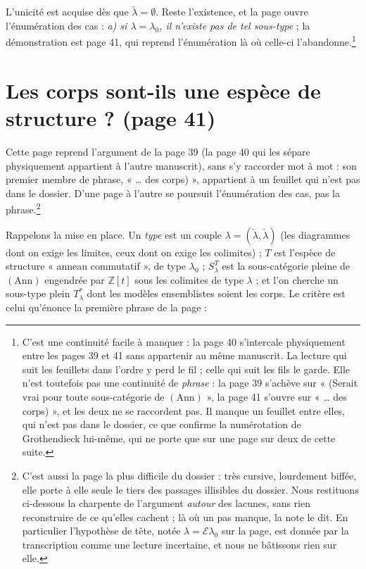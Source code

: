 \documentclass[11pt,a4paper]{article}
\begin{document}
L'unicité est acquise dès que $\underrightarrow{\lambda} = \emptyset$. Reste
l'existence, et la page ouvre l'énumération des cas : \emph{a) si
$\lambda = \lambda_{0}$, il n'existe pas de tel sous-type} ; la démonstration
est page 41, qui reprend l'énumération là où celle-ci
l'abandonne.\footnote{C'est une continuité facile à manquer : la page 40
s'intercale physiquement entre les pages 39 et 41 sans appartenir au même
manuscrit. La lecture qui suit les feuillets dans l'ordre y perd le fil ; celle
qui suit les fils le garde. Elle n'est toutefois pas une continuité de
\emph{phrase} : la page 39 s'achève sur « (Serait vrai pour toute
sous-catégorie de $(\mathrm{Ann})$ », la page 41 s'ouvre sur « \ldots{} des
corps) », et les deux ne se raccordent pas. Il manque un feuillet entre elles,
qui n'est pas dans le dossier, ce que confirme la numérotation de
Grothendieck lui-même, qui ne porte que sur une page sur deux de cette suite.}

\section*{Les corps sont-ils une espèce de structure ? (page 41)}

Cette page reprend l'argument de la page 39 (la page 40 qui les sépare
physiquement appartient à l'autre manuscrit), sans s'y raccorder
mot à mot : son premier membre de phrase, « \ldots{} des corps) », appartient
à un feuillet qui n'est pas dans le dossier. D'une page à l'autre se poursuit
l'énumération des cas, pas la phrase.\footnote{C'est aussi la
page la plus difficile du dossier : très cursive, lourdement biffée, elle porte
à elle seule le tiers des passages illisibles du dossier. Nous restituons ci-dessous
la charpente de l'argument \emph{autour} des lacunes, sans rien reconstruire de
ce qu'elles cachent ; là où un pas manque, la note le dit. En particulier
l'hypothèse de tête, notée $\lambda = \mathcal{E}\lambda_{0}$ sur la page, est
donnée par la transcription comme une lecture incertaine, et nous ne bâtissons
rien sur elle.}

Rappelons la mise en place. Un \emph{type} est un couple
$\lambda = (\underleftarrow{\lambda}, \underrightarrow{\lambda})$ (les
diagrammes dont on exige les limites, ceux dont on exige les colimites) ; $T$
est l'espèce de structure « anneau commutatif », de type $\lambda_{0}$ ;
$S^{T}_{\lambda}$ est la sous-catégorie pleine de $(\mathrm{Ann})$ engendrée par
$\mathbb{Z}[t]$ sous les colimites de type $\lambda$ ; et l'on cherche un
sous-type plein $T^{*}_{\lambda}$ dont les modèles ensemblistes soient les
corps. Le critère est celui qu'énonce la première phrase de la page :
\end{document}
